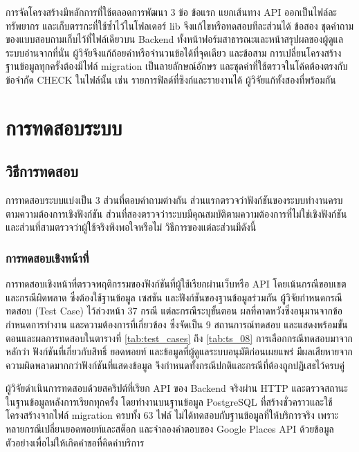 การจัดโครงสร้างมีหลักการที่ใช้ตลอดการพัฒนา 3 ข้อ ข้อแรก แยกเส้นทาง API ออกเป็นไฟล์ละทรัพยากร และเก็บตรรกะที่ใช้ซ้ำไว้ในโฟลเดอร์ lib จึงแก้ไขหรือทดสอบทีละส่วนได้ ข้อสอง ชุดคำถามของแบบสอบถามเก็บไว้ที่ไฟล์เดียวบน Backend ทั้งหน้าฟอร์มสาธารณะและหน้าสรุปผลของผู้ดูแลระบบอ่านจากที่นั่น ผู้วิจัยจึงแก้ถ้อยคำหรือจำนวนข้อได้ที่จุดเดียว และข้อสาม การเปลี่ยนโครงสร้างฐานข้อมูลทุกครั้งต้องมีไฟล์ migration เป็นลายลักษณ์อักษร และชุดค่าที่ใช้ตรวจในโค้ดต้องตรงกับข้อจำกัด CHECK ในไฟล์นั้น เช่น รายการฟิลด์ที่ซิงก์และรายงานได้ ผู้วิจัยแก้ทั้งสองที่พร้อมกัน

\section{การทดสอบระบบ}

\subsection{วิธีการทดสอบ}

การทดสอบระบบแบ่งเป็น 3 ส่วนที่ตอบคำถามต่างกัน ส่วนแรกตรวจว่าฟังก์ชันของระบบทำงานครบตามความต้องการเชิงฟังก์ชัน ส่วนที่สองตรวจว่าระบบมีคุณสมบัติตามความต้องการที่ไม่ใช่เชิงฟังก์ชัน และส่วนที่สามตรวจว่าผู้ใช้จริงพึงพอใจหรือไม่ วิธีการของแต่ละส่วนมีดังนี้

\subsubsection{การทดสอบเชิงหน้าที่}

การทดสอบเชิงหน้าที่ตรวจพฤติกรรมของฟังก์ชันที่ผู้ใช้เรียกผ่านเว็บหรือ API โดยเน้นกรณีขอบเขตและกรณีผิดพลาด ซึ่งต้องใช้ฐานข้อมูล เซสชัน และฟังก์ชันของฐานข้อมูลร่วมกัน ผู้วิจัยกำหนดกรณีทดสอบ (Test Case) ไว้ล่วงหน้า 37 กรณี แต่ละกรณีระบุขั้นตอน ผลที่คาดหวังซึ่งอนุมานจากข้อกำหนดการทำงาน และความต้องการที่เกี่ยวข้อง ซึ่งจัดเป็น 9 สถานการณ์ทดสอบ และแสดงพร้อมขั้นตอนและผลการทดสอบในตารางที่ \ref{tab:test_cases} ถึง \ref{tab:ts_08} การเลือกกรณีทดสอบมาจากหลักว่า ฟังก์ชันที่เกี่ยวกับสิทธิ์ ยอดพอยท์ และข้อมูลที่ผู้ดูแลระบบอนุมัติก่อนเผยแพร่ มีผลเสียหายจากความผิดพลาดมากกว่าฟังก์ชันที่แสดงข้อมูล จึงกำหนดทั้งกรณีปกติและกรณีที่ต้องถูกปฏิเสธไว้ครบคู่

ผู้วิจัยดำเนินการทดสอบด้วยสคริปต์ที่เรียก API ของ Backend จริงผ่าน HTTP และตรวจสถานะในฐานข้อมูลหลังการเรียกทุกครั้ง โดยทำงานบนฐานข้อมูล PostgreSQL ที่สร้างชั่วคราวและใช้โครงสร้างจากไฟล์ migration ครบทั้ง 63 ไฟล์ ไม่ได้ทดสอบกับฐานข้อมูลที่ให้บริการจริง เพราะหลายกรณีเปลี่ยนยอดพอยท์และสต็อก และจำลองคำตอบของ Google Places API ด้วยข้อมูลตัวอย่างเพื่อไม่ให้เกิดคำขอที่คิดค่าบริการ

